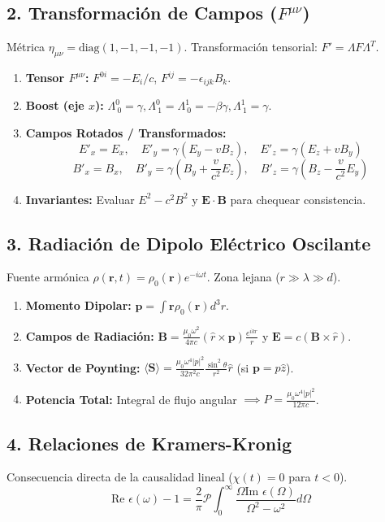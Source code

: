 \documentclass[twocolumn]{article}
\begin{document}
	\subsection*{2. Transformación de Campos ($F^{\mu\nu}$)}
	Métrica $\eta_{\mu\nu}=\text{diag}(1,-1,-1,-1)$. Transformación tensorial: $F' = \Lambda F \Lambda^T$.
	\begin{enumerate}
		\item {\bf Tensor $F^{\mu\nu}$:} $F^{0i} = -E_i/c$, $F^{ij} = -\epsilon_{ijk}B_k$.
		\item {\bf Boost (eje $x$):} $\Lambda^0_{\ 0}=\gamma, \Lambda^0_{\ 1}=\Lambda^1_{\ 0}=-\beta\gamma, \Lambda^1_{\ 1}=\gamma$.
		\item {\bf Campos Rotados / Transformados:}
		$$E'_x = E_x, \quad E'_y = \gamma(E_y - vB_z), \quad E'_z = \gamma(E_z + vB_y)$$
		$$B'_x = B_x, \quad B'_y = \gamma(B_y + \frac{v}{c^2}E_z), \quad B'_z = \gamma(B_z - \frac{v}{c^2}E_y)$$
		\item {\bf Invariantes:} Evaluar $E^2-c^2B^2$ y $\mathbf{E}\cdot\mathbf{B}$ para chequear consistencia.
	\end{enumerate}
	
	\subsection*{3. Radiación de Dipolo Eléctrico Oscilante}
	Fuente armónica $\rho(\mathbf{r},t)=\rho_0(\mathbf{r})e^{-i\omega t}$. Zona lejana ($r \gg \lambda \gg d$).
	\begin{enumerate}
		\item {\bf Momento Dipolar:} $\mathbf{p} = \int \mathbf{r}\rho_0(\mathbf{r})d^3r$.
		\item {\bf Campos de Radiación:} $\mathbf{B} = \frac{\mu_0\omega^2}{4\pi c}(\hat{r}\times\mathbf{p})\frac{e^{ikr}}{r}$ y $\mathbf{E} = c(\mathbf{B}\times\hat{r})$.
		\item {\bf Vector de Poynting:} $\langle\mathbf{S}\rangle = \frac{\mu_0\omega^4|p|^2}{32\pi^2 c}\frac{\sin^2\theta}{r^2}\hat{r}$ (si $\mathbf{p}=p\hat{z}$).
		\item {\bf Potencia Total:} Integral de flujo angular $\implies P = \frac{\mu_0\omega^4|p|^2}{12\pi c}$.
	\end{enumerate}
	
	\subsection*{4. Relaciones de Kramers-Kronig}
	Consecuencia directa de la causalidad lineal ($\chi(t)=0$ para $t<0$).
	$$\text{Re }\epsilon(\omega) - 1 = \frac{2}{\pi}\mathcal{P}\int_0^\infty \frac{\Omega \text{Im }\epsilon(\Omega)}{\Omega^2-\omega^2}d\Omega$$
	
\end{document}
